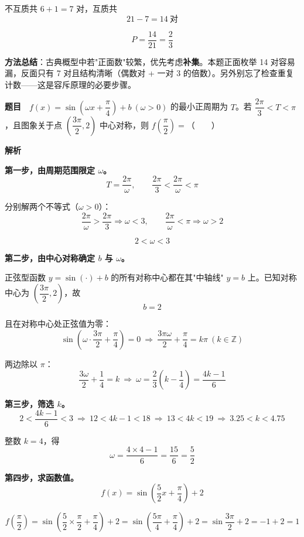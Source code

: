 不互质共 $6+1=7$ 对，互质共
\[21-7=14\ \text{对}\]

\[P=\frac{14}{21}=\frac23\]


\begin{gktip}
\textbf{方法总结}：古典概型中若"正面数"较繁，优先考虑\textbf{补集}。本题正面枚举 14 对容易漏，反面只有 7 对且结构清晰（偶数对 + 一对 $3$ 的倍数）。另外别忘了检查重复计数——这是容斥原理的必要步骤。
\end{gktip}

\par\medskip


\textbf{题目}　$f(x)=\sin\left(\omega x+\dfrac\pi4\right)+b\ (\omega>0)$ 的最小正周期为 $T$。若 $\dfrac{2\pi}3<T<\pi$，且图象关于点 $\left(\dfrac{3\pi}2,2\right)$ 中心对称，则 $f\left(\dfrac\pi2\right)=$（　　）

\textbf{解析}

\textbf{第一步，由周期范围限定 $\omega$。}
\[T=\frac{2\pi}\omega,\qquad \frac{2\pi}3<\frac{2\pi}\omega<\pi\]

分别解两个不等式（$\omega>0$）：
\[\frac{2\pi}\omega>\frac{2\pi}3\Rightarrow\omega<3,\qquad \frac{2\pi}\omega<\pi\Rightarrow\omega>2\]

\[2<\omega<3\]

\textbf{第二步，由中心对称确定 $b$ 与 $\omega$。}

正弦型函数 $y=\sin(\cdot)+b$ 的所有对称中心都在其"中轴线" $y=b$ 上。已知对称中心为 $\left(\dfrac{3\pi}2,2\right)$，故
\[b=2\]

且在对称中心处正弦值为零：
\[\sin\left(\omega\cdot\frac{3\pi}2+\frac\pi4\right)=0\ \Longrightarrow\ \frac{3\pi\omega}2+\frac\pi4=k\pi\ (k\in\mathbb Z)\]

两边除以 $\pi$：
\[\frac{3\omega}2+\frac14=k\ \Longrightarrow\ \omega=\frac{2}{3}\left(k-\frac14\right)=\frac{4k-1}6\]

\textbf{第三步，筛选 $k$。}
\[2<\frac{4k-1}6<3\ \Longrightarrow\ 12<4k-1<18\ \Longrightarrow\ 13<4k<19\ \Longrightarrow\ 3.25<k<4.75\]

整数 $k=4$，得
\[\omega=\frac{4\times4-1}6=\frac{15}6=\frac52\]

\textbf{第四步，求函数值。}
\[f(x)=\sin\left(\frac52x+\frac\pi4\right)+2\]

\[f\left(\frac\pi2\right)=\sin\left(\frac52\times\frac\pi2+\frac\pi4\right)+2=\sin\left(\frac{5\pi}4+\frac\pi4\right)+2=\sin\frac{3\pi}2+2=-1+2=1\]

